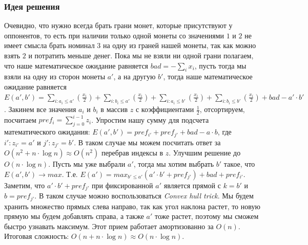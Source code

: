 %
%


\subsubsection*{Идея решения}
Очевидно, что нужно всегда брать грани монет, которые присутствуют у оппонентов, то есть при наличии только одной монеты со значениями $1$ и $2$ не имеет смысла брать номинал $3$ на одну из граней нашей монеты, так как можно взять $2$ и потратить меньше денег. Пока мы не взяли ни одной грани полагаем, что наше математическое ожидание равняется $bad = -\sum_{i}x_i$, пусть тогда мы взяли на одну из сторон монеты $a'$, а на другую $b'$, тогда наше математическое ожидание равняется $E(a',b') = \sum_{i : a_i \leqslant a'}(\frac{x_i}{2}) + \sum_{i : b_i \leqslant a'}(\frac{x_i}{2}) + \sum_{i : a_i \leqslant b'}(\frac{x_i}{2}) + \sum_{i : b_i \leqslant b'}(\frac{x_i}{2}) + bad - a' \cdot b'$. Закинем все значения $a_i$ и $b_i$ в массив $z$ с коэффициентами $\frac{1}{2}$, отсортируем, посчитаем $pref_i = \sum_{j = 0}^{i - 1}z_i$. Упростим нашу сумму для подсчета математического ожидания: $E(a',b') = pref_{i'} + pref_{j'} + bad - a \cdot b$, где $i' : z_{i'} = a'$ и $j' : z_{j'} = b'$. В таком случае мы можем посчитать ответ за $O(n ^ 2 + n \cdot \log{n}) \approx O(n ^ 2)$ перебрав индексы в $z$. Улучшим решение до $O(n \cdot \log{n})$. Пусть мы уже выбрали $a'$, тогда мы хотим выбрать $b'$ такое, что $E(a', b') \rightarrow max$. Т.е. $E(a') = max_{b' \leqslant a'}(a'\cdot b' + pref_{j'}) + bad + pref_{i'}$. Заметим, что $a'\cdot b' + pref_{j'}$ при фиксированной $a'$ является прямой с $k = b'$ и $b = pref_{j'}$. В таком случае можно воспользоваться \textit{Convex hull trick}. Мы будем хранить множество прямых слева направо, так как угол наклона растет, то новую прямую мы будем добавлять справа, а также $a'$ тоже растет, поэтому мы сможем быстро узнавать максимум. Этот прием работает амортизованно за $O(n)$. Итоговая сложность: $O(n + n \cdot \log{n}) \approx O(n \cdot \log{n})$.
